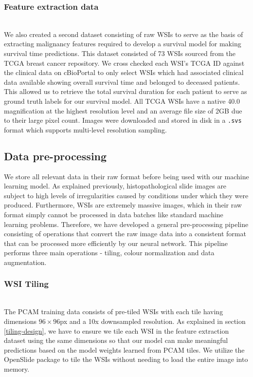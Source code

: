 \documentclass{l4proj}
\begin{document}
\subsubsection{Feature extraction data}\hfill\\
We also created a second dataset consisting of raw WSIs to serve as the basis of extracting malignancy features required to develop a survival model for making survival time predictions. This dataset consisted of 73 WSIs sourced from the TCGA breast cancer repository. We cross checked each WSI's TCGA ID against the clinical data on cBioPortal to only select WSIs which had associated clinical data available showing overall survival time and belonged to deceased patients. This allowed us to retrieve the total survival duration for each patient to serve as ground truth labels for our survival model. All TCGA WSIs have a native 40.0 magnification at the highest resolution level and an average file size of 2GB due to their large pixel count. Images were downloaded and stored in disk in a \texttt{.svs} format which supports multi-level resolution sampling.  

\subsection{Data pre-processing}
We store all relevant data in their raw format before being used with our machine learning model. As explained previously, histopathological slide images are subject to high levels of irregularities caused by conditions under which they were produced. Furthermore, WSIs are extremely massive images, which in their raw format simply cannot be processed in data batches like standard machine learning problems. Therefore, we have developed a general pre-processing pipeline consisting of  operations that convert the raw image data into a consistent format that can be processed more efficiently by our neural network. This pipeline performs three main operations - tiling, colour normalization and data augmentation. 
\\
\subsubsection{WSI Tiling}\hfill\\
The PCAM training data consists of pre-tiled WSIs with each tile having dimensions \(96 \times 96\)px and a 10x downsampled resolution. As explained in section \ref{tiling-design}, we have to ensure we tile each WSI in the feature extraction dataset using the same dimensions so that our model can make meaningful predictions based on the model weights learned from PCAM tiles. We utilize the OpenSlide package to tile the WSIs without needing to load the entire image into memory. 
\end{document}
